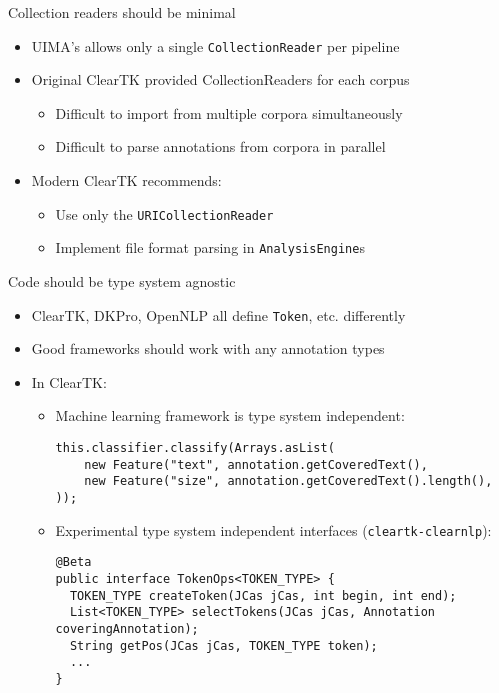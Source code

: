 \documentclass[final]{beamer}
\newcommand{\code}[1]{\texttt{\small #1}}
\begin{document}
\begin{frame}[fragile]
\begin{columns}[t]
\begin{column}{.45\linewidth}
    \begin{block}{Collection readers should be minimal}
      \begin{itemize}
              \item UIMA's allows only a single \code{CollectionReader} per pipeline
              \item Original ClearTK provided CollectionReaders for each corpus
                      \begin{itemize}
                      \item Difficult to import from multiple corpora simultaneously
                      \item Difficult to parse annotations from corpora in parallel
                      \end{itemize}
              \item Modern ClearTK recommends:
                      \begin{itemize}
                      \item Use only the \code{URICollectionReader}
                      \item Implement file format parsing in \code{AnalysisEngine}s
                      \end{itemize}
      \end{itemize}
    \end{block}


    \begin{block}{Code should be type system agnostic}
    \begin{itemize}
        \item ClearTK, DKPro, OpenNLP all define \code{Token}, etc. differently
        \item Good frameworks should work with any annotation types
    \bigskip
        \item In ClearTK:
        \begin{itemize}
            \item Machine learning framework is type system independent:
\begin{lstlisting}
this.classifier.classify(Arrays.asList(
    new Feature("text", annotation.getCoveredText(),
    new Feature("size", annotation.getCoveredText().length(),
));
\end{lstlisting}
            \item Experimental type system independent interfaces (\code{cleartk-clearnlp}):
\begin{lstlisting}
@Beta
public interface TokenOps<TOKEN_TYPE> {
  TOKEN_TYPE createToken(JCas jCas, int begin, int end);
  List<TOKEN_TYPE> selectTokens(JCas jCas, Annotation coveringAnnotation);
  String getPos(JCas jCas, TOKEN_TYPE token);
  ...
}
\end{lstlisting}
        \end{itemize}
    \end{itemize}
                    

\end{block}
\end{column}
\end{columns}
\end{frame}
\end{document}

